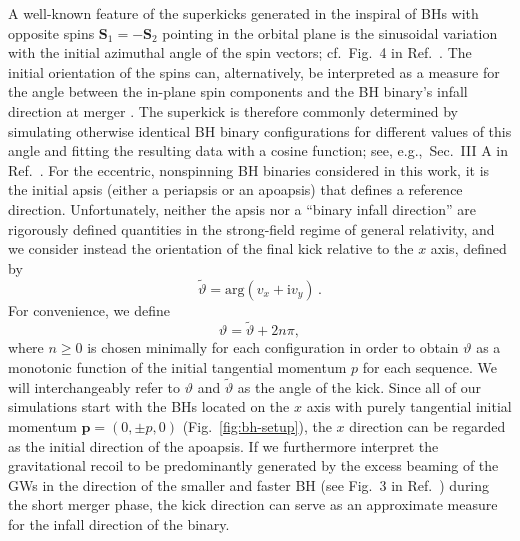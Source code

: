 \documentclass[floats,floatfix,showpacs,amssymb,physrev,twocolumn,superscriptaddress,reprint,
nofootinbib, longbibliography]{revtex4-2}
\begin{document}
%
A well-known feature of the superkicks generated in the inspiral
of BHs with opposite spins $\boldsymbol{S}_1=-\boldsymbol{S}_2$
pointing in the orbital
plane is the sinusoidal variation with the initial azimuthal angle
of the spin vectors; cf.~Fig.~4 in Ref.~\cite{Bruegmann:2007zj}.
The initial orientation of the spins can, alternatively, be
interpreted as a measure for the angle between the in-plane
spin components and the BH binary's infall direction at merger
\cite{Lousto:2009ka}. The superkick is therefore commonly
determined by simulating otherwise identical BH binary configurations
for different values of this angle and fitting the resulting data
with a cosine function; see, e.g.,~Sec.~III A in
Ref.~\cite{Sperhake:2019wwo}. For the eccentric, nonspinning BH
binaries considered in this work, it is the
initial apsis (either a periapsis or an apoapsis)
that defines a reference direction. Unfortunately,
neither the apsis nor a ``binary infall direction''
are rigorously defined
quantities in the strong-field regime of general relativity,
and we consider instead the orientation of the final
kick relative to the $x$ axis, defined by
%
\begin{equation}
  \tilde{\vartheta} = \mathrm{arg}(v_x + \mathrm{i}v_y)\,.
\end{equation}
For convenience, we define
\begin{equation}
    \vartheta = \tilde{\vartheta} + 2n\pi,
\end{equation}
where $n\geq 0$ is chosen minimally for each configuration in order to obtain
$\vartheta$ as a monotonic function of the initial tangential momentum $p$
for each sequence. We will interchangeably refer to $\vartheta$ 
and $\tilde{\vartheta}$ as the angle of the kick.
%
Since all of our simulations start with the BHs located on the $x$
axis with purely tangential initial momentum $\mathbf{p}=(0,\pm p,0)$
(Fig.~\ref{fig:bh-setup}), the $x$ direction can be regarded as the
initial direction of the apoapsis. If we furthermore interpret the
gravitational recoil to be predominantly generated by the excess
beaming of the GWs in the direction of the smaller and faster BH (see
Fig.~3 in Ref.~\cite{Wiseman:1992dv}) during the short merger phase,
the kick direction can serve as an approximate measure for the infall
direction of the binary. 
\end{document}
